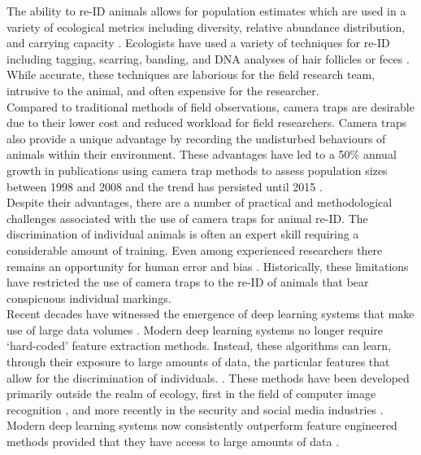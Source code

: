 \documentclass[11pt]{article}
\begin{document}
The ability to re-ID animals allows for population estimates which are used in a variety of ecological metrics including diversity, relative abundance distribution, and carrying capacity \cite{krebs1989ecological}. Ecologists have used a variety of techniques for re-ID including tagging, scarring, banding, and DNA analyses of hair follicles or feces \cite{krebs1989ecological}. While accurate, these techniques are laborious for the field research team, intrusive to the animal, and often expensive for the researcher.
\newline
\\
Compared to traditional methods of field observations, camera traps are desirable due to their lower cost and reduced workload for field researchers. Camera traps also provide a unique advantage by recording the undisturbed behaviours of animals within their environment. These advantages have led to a 50\% annual growth in publications using camera trap methods to assess population sizes between 1998 and 2008 and the trend has persisted until 2015 \cite{rowcliffe2008estimating, burton2015wildlife}. 
\newline
\\
Despite their advantages, there are a number of practical and methodological challenges associated with the use of camera traps for animal re-ID. The discrimination of individual animals is often an expert skill requiring a considerable amount of training. Even among experienced researchers there remains an opportunity for human error and bias \cite{foster2012critique, meek2013reliability}. Historically, these limitations have restricted the use of camera traps to the re-ID of animals that bear conspicuous individual markings. 
\newline
\\ 
Recent decades have witnessed the emergence of deep learning systems that make use of large data volumes \cite{zheng2015scalable}. Modern deep learning systems no longer require `hard-coded' feature extraction methods. Instead, these algorithms can learn, through their exposure to large amounts of data, the particular features that allow for the discrimination of individuals. \cite{lecun2015deep}. These methods have been developed primarily outside the realm of ecology, first in the field of computer image recognition \cite{krizhevsky2012imagenet}, and more recently in the security and social media industries \cite{zheng2015scalable}. Modern deep learning systems now consistently outperform feature engineered methods provided that they have access to large amounts of data \cite{lisanti2015person, martinel2015re}. 
\end{document}
